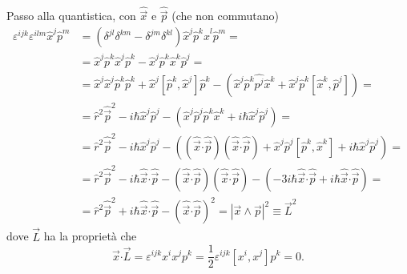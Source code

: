 Passo alla quantistica, con \( \hat{\vec{x}} \) e \( \hat{\vec{p}} \) (che non commutano)
\begin{align*}
\varepsilon^{ijk} \varepsilon^{ilm} \hat{x}^j \hat{p}^m &= (\delta^{jl}\delta^{km} - \delta^{jm}\delta^{kl}) \hat{x}^j \hat{p}^k \hat{x}^l \hat{p}^m = \\
&= \hat{x}^j \hat{p}^k \hat{x}^j \hat{p}^k - \hat{x}^j \hat{p}^k \hat{x}^k \hat{p}^j = \\
&= \hat{x}^j \hat{x}^j \hat{p}^k \hat{p}^k + \hat{x}^j [\hat{p}^k, \hat{x}^j] \hat{p}^k - (\hat{x}^j \hat{p}^k \hat{p^j} \hat{x}^k + \hat{x}^j \hat{p}^k [\hat{x}^k, \hat{p}^j]) = \\
&= \hat{r}^2 \hat{\vec{p}}^2 - i\hbar \hat{x}^j \hat{p}^j - (\hat{x}^j \hat{p}^j \hat{p}^k \hat{x}^k + i\hbar \hat{x}^j \hat{p}^j) = \\
&= \hat{r}^2 \hat{\vec{p}}^2 - i\hbar \hat{x}^j \hat{p}^j - ((\hat{\vec{x}} \mathbf{\cdot} \hat{\vec{p}})(\hat{\vec{x}} \mathbf{\cdot} \hat{\vec{p}}) + \hat{x}^j \hat{p}^j [\hat{p}^k, \hat{x}^k] + i\hbar \hat{x}^j \hat{p}^j) = \\
&= \hat{r}^2 \hat{\vec{p}}^2 -i\hbar\hat{\vec{x}} \mathbf{\cdot} \hat{\vec{p}} - (\hat{\vec{x}} \mathbf{\cdot} \hat{\vec{p}}) (\hat{\vec{x}} \mathbf{\cdot} \hat{\vec{p}}) - (-3i\hbar\hat{\vec{x}} \mathbf{\cdot} \hat{\vec{p}} + i\hbar\hat{\vec{x}} \mathbf{\cdot} \hat{\vec{p}}) = \\
&= \hat{r}^2 \hat{\vec{p}}^2 + i\hbar \hat{\vec{x}} \mathbf{\cdot} \hat{\vec{p}} - (\hat{\vec{x}} \mathbf{\cdot} \hat{\vec{p}})^2 = |\vec{x} \wedge \vec{p}|^2 \equiv \vec{L}^2
\end{align*}
dove \( \vec{L} \) ha la proprietà che
\[
\vec{x} \mathbf{\cdot} \vec{L} = \varepsilon^{ijk} x^i x^j p^k = \frac{1}{2} \varepsilon^{ijk} [x^i, x^j] p^k = 0.
\]